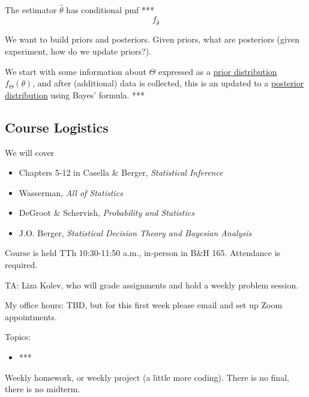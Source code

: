 The estimator $\hat\theta$ has conditional \textsf{pmf}
***
\[f_{\hat\theta}\]

\begin{definition}
    We want to build priors and posteriors. Given priors, what are posteriors (given experiment, how do we update priors?).

    We start with some information about $\Theta$ expressed as a \ul{prior distribution} $f_{\Theta}(\theta)$, and after (additional) data is collected, this is an updated to a \ul{posterior distribution} using Bayes' formula.
    ***
\end{definition}

\subsection{Course Logistics}
We will cover
\begin{itemize}
    \item Chapters 5-12 in Casella \& Berger, \emph{Statistical Inference} \cite{casella2002statistical}
    \item Wasserman, \emph{All of Statistics} \cite{wasserman2004all}
    \item DeGroot \& Schervish, \emph{Probability and Statistics} \cite{degroot2012probability}
    \item J.O. Berger, \emph{Statistical Decision Theory and Bayesian Analysis} \cite{berger1985statistical}
\end{itemize}

Course is held TTh 10:30-11:50 a.m., in-person in B\&H 165. Attendance is required.

TA: Liza Kolev, who will grade assignments and hold a weekly problem session.

My office hours: TBD, but for this first week please email and set up Zoom appointments.

Topics: 
\begin{itemize}
    \item ***
\end{itemize}

Weekly homework, or weekly project (a little more coding). There is no final, there is no midterm. 